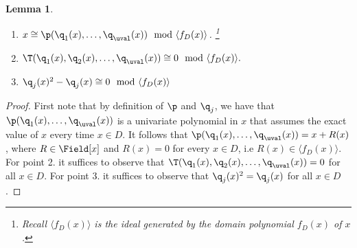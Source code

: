 \documentclass[11pt]{article}
\newtheorem{lemma}[theorem]{Lemma}
\begin{document}
\begin{lemma}\label{th:x}
    \begin{enumerate}
        \item $x \cong \p(\q_1(x),\ldots,\q_\uval(x)) \mod{\langle f_D(x)\rangle}$. \footnote{Recall $\langle f_D(x)\rangle$ is the ideal generated by the domain polynomial $f_D(x)$ of $x$.}
        \item $\T(\q_1(x), \q_2(x), \dots, \q_{\uval}(x)) \cong 0 \mod{\langle f_D(x)\rangle}.$
        \item $\q_{j}(x)^2 - \q_{j}(x) \cong 0 \mod{\langle f_D(x)\rangle}$
    \end{enumerate}
\end{lemma}
\begin{proof}
    First note that by definition of $\p$ and $\q_j$, we have that $\p(\q_1(x),\ldots,\q_\uval(x))$ is a univariate polynomial in $x$ that assumes the exact value of $x$ every time $x\in D$. It follows that  $\p(\q_1(x),\ldots,\q_\uval(x))= x + R(x)$, where $R\in \Field[x]$ and $R(x)=0$ for every $x\in D$, i.e $R(x)\in \langle f_D(x)\rangle$. \\
    For point 2. it suffices to observe that $\T(\q_1(x), \q_2(x), \dots, \q_{\uval}(x)) = 0$ for all $x \in D$. For point 3. it suffices to observe that $\q_{j}(x)^2 = \q_{j}(x)$ for all $x \in D$.
\end{proof}
\end{document}
